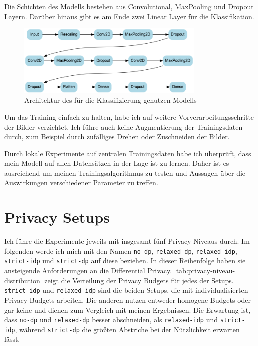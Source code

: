 Die Schichten des Modells bestehen aus Convolutional, MaxPooling und Dropout Layern. Darüber hinaus gibt es am Ende zwei Linear Layer für die Klassifikation.

\begin{figure}[tb]
	\centering
	\includegraphics[width=0.8\textwidth]{Bilder/model_architecture_1.png}
	\caption{Architektur des für die Klassifizierung genutzen Modells}
	\label{fig:model-architecture}
\end{figure}

Um das Training einfach zu halten, habe ich auf weitere Vorverarbeitungsschritte der Bilder verzichtet. Ich führe auch keine Augmentierung der Trainingsdaten durch, zum Beispiel durch zufälliges Drehen oder Zuschneiden der Bilder.

Durch lokale Experimente auf zentralen Trainingsdaten habe ich überprüft, dass mein Modell auf allen Datensätzen in der Lage ist zu lernen. Daher ist es ausreichend um meinen Trainingsalgorithmus zu testen und Aussagen über die Auswirkungen verschiedener Parameter zu treffen.

\section{Privacy Setups}
Ich führe die Experimente jeweils mit insgesamt fünf Privacy-Niveaus durch. Im folgenden werde ich mich mit den Namen \texttt{no-dp}, \texttt{relaxed-dp}, \texttt{relaxed-idp}, \texttt{strict-idp} und \texttt{strict-dp} auf diese beziehen. In dieser Reihenfolge haben sie ansteigende Anforderungen an die Differential Privacy. \autoref{tab:privacy-niveau-distribution} zeigt die Verteilung der Privacy Budgets für jedes der Setups. \texttt{strict-idp} und \texttt{relaxed-idp} sind die beiden Setups, die mit individualisierten Privacy Budgets arbeiten. Die anderen nutzen entweder homogene Budgets oder gar keine und dienen zum Vergleich mit meinen Ergebnissen. Die Erwartung ist, dass \texttt{no-dp} und \texttt{relaxed-dp} besser abschneiden, als \texttt{relaxed-idp} und \texttt{strict-idp}, während \texttt{strict-dp} die größten Abstriche bei der Nützlichkeit erwarten lässt.


